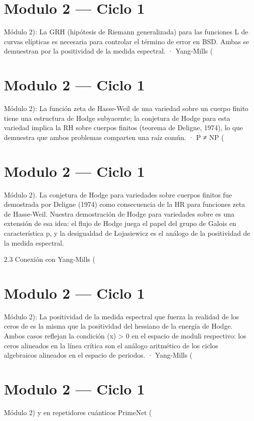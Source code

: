 \documentclass[12pt,twoside]{book}
\begin{document}
\chapter{Modulo 2 — Ciclo 1}
Módulo 2): La GRH (hipótesis de Riemann generalizada) para las funciones L de curvas elípticas es necesaria para controlar el término de error en BSD. Ambas se demuestran por la positividad de la medida espectral.
· Yang‑Mills (

\chapter{Modulo 2 — Ciclo 1}
Módulo 2): La función zeta de Hasse-Weil de una variedad sobre un cuerpo finito tiene una estructura de Hodge subyacente; la conjetura de Hodge para esta variedad implica la RH sobre cuerpos finitos (teorema de Deligne, 1974), lo que demuestra que ambos problemas comparten una raíz común.
· P ≠ NP (

\chapter{Modulo 2 — Ciclo 1}
Módulo 2).
La conjetura de Hodge para variedades sobre cuerpos finitos fue demostrada por Deligne (1974) como consecuencia de la HR para funciones zeta de Hasse-Weil. Nuestra demostración de Hodge para variedades sobre  es una extensión de esa idea: el flujo de Hodge juega el papel del grupo de Galois en característica p, y la desigualdad de Lojasiewicz es el análogo de la positividad de la medida espectral.

2.3 Conexión con Yang-Mills (

\chapter{Modulo 2 — Ciclo 1}
Módulo 2): La positividad de la medida espectral que fuerza la realidad de los ceros de \zeta es la misma que la positividad del hessiano de la energía de Hodge. Ambos casos reflejan la condición \rho(x) > 0 en el espacio de moduli respectivo: los ceros alineados en la línea crítica son el análogo aritmético de los ciclos algebraicos alineados en el espacio de periodos.
· Yang‑Mills (

\chapter{Modulo 2 — Ciclo 1}
Módulo 2) y en repetidores cuánticos PrimeNet (
\end{document}
